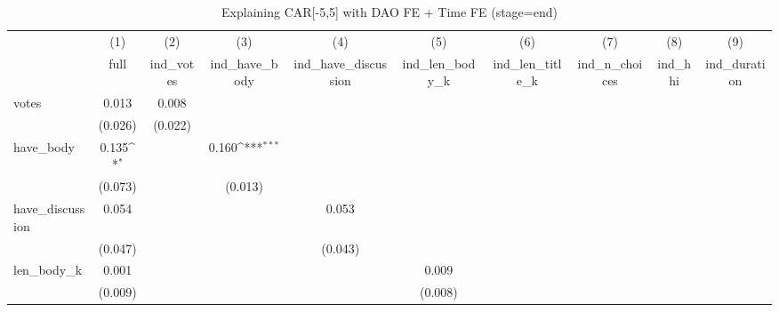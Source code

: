 \begin{table}[htbp]\centering
\def\sym#1{\ifmmode^{#1}\else\(^{#1}\)\fi}
\caption{Explaining CAR[-5,5] with DAO FE + Time FE (stage=end)}
\begin{tabular}{l*{9}{c}}
\hline\hline
          &\multicolumn{1}{c}{(1)}         &\multicolumn{1}{c}{(2)}         &\multicolumn{1}{c}{(3)}         &\multicolumn{1}{c}{(4)}         &\multicolumn{1}{c}{(5)}         &\multicolumn{1}{c}{(6)}         &\multicolumn{1}{c}{(7)}         &\multicolumn{1}{c}{(8)}         &\multicolumn{1}{c}{(9)}         \\
          &     full         &ind\_votes         &ind\_have\_body         &ind\_have\_discussion         &ind\_len\_body\_k         &ind\_len\_title\_k         &ind\_n\_choices         &  ind\_hhi         &ind\_duration         \\
\hline
votes     &    0.013         &    0.008         &                  &                  &                  &                  &                  &                  &                  \\
          &  (0.026)         &  (0.022)         &                  &                  &                  &                  &                  &                  &                  \\
have\_body &    0.135\sym{*}  &                  &    0.160\sym{***}&                  &                  &                  &                  &                  &                  \\
          &  (0.073)         &                  &  (0.013)         &                  &                  &                  &                  &                  &                  \\
have\_discussion&    0.054         &                  &                  &    0.053         &                  &                  &                  &                  &                  \\
          &  (0.047)         &                  &                  &  (0.043)         &                  &                  &                  &                  &                  \\
len\_body\_k&    0.001         &                  &                  &                  &    0.009         &                  &                  &                  &                  \\
          &  (0.009)         &                  &                  &                  &  (0.008)         &                  &                  &                  &                  \\

\end{tabular}
\end{table}
